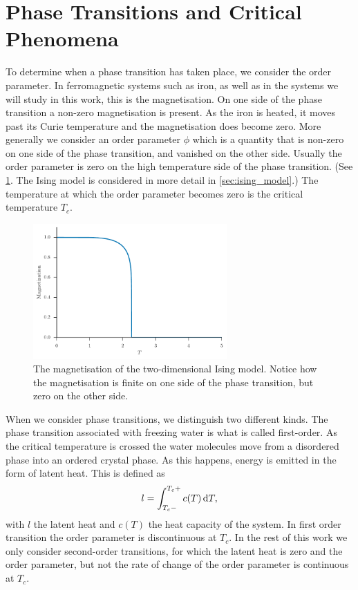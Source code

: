 \documentclass[11pt, a4paper]{report} %
\begin{document}
\section{Phase Transitions and Critical Phenomena}
To determine when a phase transition has taken place, we consider the order parameter.
In ferromagnetic systems such as iron, as well as in the systems we will study in this work, this is the magnetisation.
On one side of the phase transition a non-zero magnetisation is present.
As the iron is heated, it moves past its Curie temperature and the magnetisation does become zero.
More generally we consider an order parameter \(\phi\) which is a quantity that is non-zero on one side of the phase transition, and vanished on the other side. Usually the order parameter is zero on the high temperature side of the phase transition. (See \cref{fig:ising_magnetization}. The Ising model is considered in more detail in \cref{sec:ising_model}.)
The temperature at which the order parameter becomes zero is the critical temperature \(T_c\).
\begin{figure}[htb]
	\centering
	\includegraphics[width=0.66\textwidth]{ising_magnetization}
	\caption{The magnetisation of the two-dimensional Ising model. Notice how the magnetisation is finite on one side of the phase transition, but zero on the other side.}
	\label{fig:ising_magnetization}
\end{figure}

When we consider phase transitions, we distinguish two different kinds.
The phase transition associated with freezing water is what is called first-order.
As the critical temperature is crossed the water molecules move from a disordered phase into an ordered crystal phase.
As this happens, energy is emitted in the form of latent heat.
This is defined as
\begin{equation}
	\label{eq:latent_heat}
	l = \int_{T_c-}^{T_c+} c(T) \dif T,
\end{equation}
with \(l\) the latent heat and \(c(T)\) the heat capacity of the system.
In first order transition the order parameter is discontinuous at \(T_c\).\cite{binney:1992}
In the rest of this work we only consider second-order transitions, for which the latent heat is zero and the order parameter, but not the rate of change of the order parameter is continuous at \(T_c\).
\end{document}
